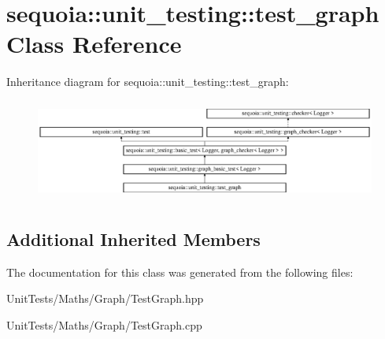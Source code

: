 \hypertarget{classsequoia_1_1unit__testing_1_1test__graph}{}\section{sequoia\+::unit\+\_\+testing\+::test\+\_\+graph Class Reference}
\label{classsequoia_1_1unit__testing_1_1test__graph}
Inheritance diagram for sequoia\+::unit\+\_\+testing\+::test\+\_\+graph\+:\begin{figure}[H]
\begin{center}
\leavevmode
\includegraphics[height=3.357314cm]{classsequoia_1_1unit__testing_1_1test__graph}
\end{center}
\end{figure}
\subsection*{Additional Inherited Members}


The documentation for this class was generated from the following files\+:\begin{DoxyCompactItemize}
\item 
Unit\+Tests/\+Maths/\+Graph/Test\+Graph.\+hpp\item 
Unit\+Tests/\+Maths/\+Graph/Test\+Graph.\+cpp\end{DoxyCompactItemize}
